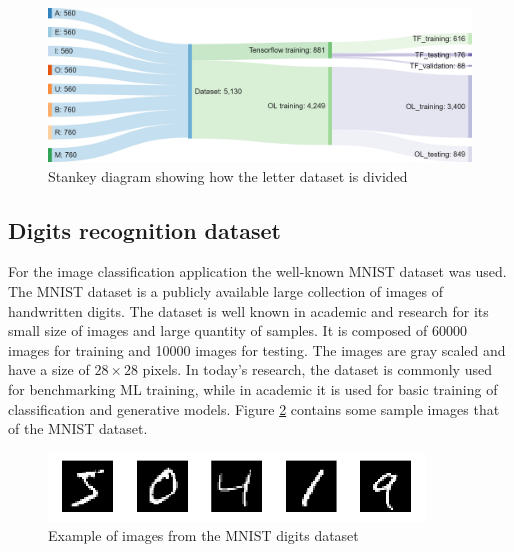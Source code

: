 \documentclass[12pt]{report}
\begin{document}
\begin{figure}[h!]
    \centering
    \includegraphics[width=120mm]{Figures/Chapter4/flow_dataset_letters.png} 
    \caption{Stankey diagram showing how the letter dataset is divided}
    \label{fig:flow_dataset_letters}    
\end{figure}

\subsection{Digits recognition dataset}
For the image classification application the well-known MNIST dataset was used. The MNIST dataset is a publicly available large collection of images of handwritten digits. The dataset is well known in academic and research for its small size of images and large quantity of samples. It is composed of 60000 images for training and 10000 images for testing. The images are gray scaled and have a size of $28 \times 28$ pixels. In today's research, the dataset is commonly used for benchmarking ML training, while in academic it is used for basic training of classification and generative models. Figure \ref{fig:mnist_dataset} contains some sample images that of the MNIST dataset.\\

\begin{figure}[h!]
    \centering
    \includegraphics[width=100mm]{Figures/Chapter4/mnist_dataset.png} 
    \caption{Example of images from the MNIST digits dataset}
    \label{fig:mnist_dataset}    
\end{figure}
\end{document}
